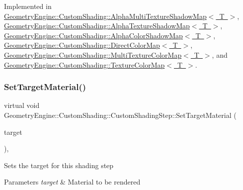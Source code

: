 Implemented in \mbox{\hyperlink{class_geometry_engine_1_1_custom_shading_1_1_alpha_multi_texture_shadow_map_ae4bed1f5f5d0200e614d62f42d58048c}{Geometry\+Engine\+::\+Custom\+Shading\+::\+Alpha\+Multi\+Texture\+Shadow\+Map$<$ T $>$}}, \mbox{\hyperlink{class_geometry_engine_1_1_custom_shading_1_1_alpha_texture_shadow_map_a32014c932093151182926d6d681314de}{Geometry\+Engine\+::\+Custom\+Shading\+::\+Alpha\+Texture\+Shadow\+Map$<$ T $>$}}, \mbox{\hyperlink{class_geometry_engine_1_1_custom_shading_1_1_alpha_color_shadow_map_a8e1174fd5d5ee8e5a86940b22235f8ec}{Geometry\+Engine\+::\+Custom\+Shading\+::\+Alpha\+Color\+Shadow\+Map$<$ T $>$}}, \mbox{\hyperlink{class_geometry_engine_1_1_custom_shading_1_1_direct_color_map_a1225b6be095646d969d8bde5f8eaac73}{Geometry\+Engine\+::\+Custom\+Shading\+::\+Direct\+Color\+Map$<$ T $>$}}, \mbox{\hyperlink{class_geometry_engine_1_1_custom_shading_1_1_multi_texture_color_map_a5cee1ebee9e647db140bc4a5d0dfdaa6}{Geometry\+Engine\+::\+Custom\+Shading\+::\+Multi\+Texture\+Color\+Map$<$ T $>$}}, and \mbox{\hyperlink{class_geometry_engine_1_1_custom_shading_1_1_texture_color_map_ab24f03e6d8dabac3889315c5e583a60d}{Geometry\+Engine\+::\+Custom\+Shading\+::\+Texture\+Color\+Map$<$ T $>$}}.

\mbox{\label{class_geometry_engine_1_1_custom_shading_1_1_custom_shading_step_a7113c454f34a3870df11420749f21d11}} 
\subsubsection{\texorpdfstring{SetTargetMaterial()}{SetTargetMaterial()}}
{\footnotesize\ttfamily virtual void Geometry\+Engine\+::\+Custom\+Shading\+::\+Custom\+Shading\+Step\+::\+Set\+Target\+Material (\begin{DoxyParamCaption}\item[{\mbox{\hyperlink{class_geometry_engine_1_1_geometry_material_1_1_material}{Geometry\+Material\+::\+Material}} $\ast$}]{target }\end{DoxyParamCaption})\hspace{0.3cm}{\ttfamily [inline]}, {\ttfamily [virtual]}}

Sets the target for this shading step 
\begin{DoxyParams}{Parameters}
{\em target} & Material to be rendered \\
\hline
\end{DoxyParams}


